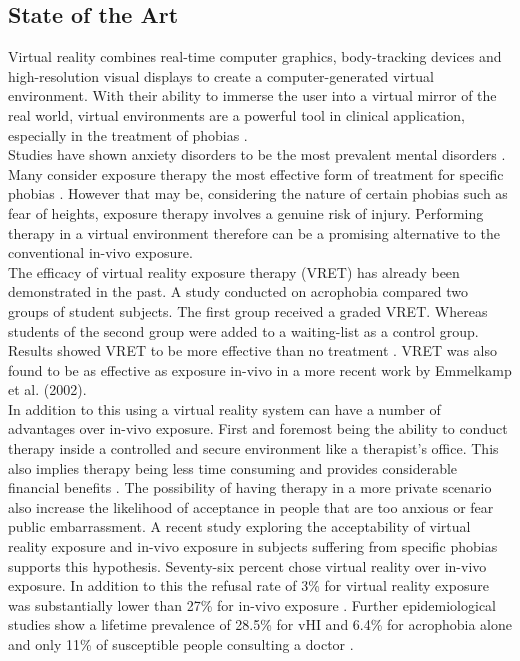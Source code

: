 \subsection{State of the Art}
Virtual reality combines real-time computer graphics, body-tracking devices and high-resolution visual displays to create a computer-generated virtual environment. With their ability to immerse the user into a virtual mirror of the real world, virtual environments are a powerful tool in clinical application, especially in the treatment of phobias \cite{RIVA2003}. \\
Studies have shown anxiety disorders to be the most prevalent mental disorders \cite{KESSLER2005}. Many consider exposure therapy the most effective form of treatment for specific phobias \cite{DERUBEIS1998}. However that may be, considering the nature of certain phobias such as fear of heights, exposure therapy involves a genuine risk of injury. Performing therapy in a virtual environment therefore can be a promising alternative to the conventional in-vivo exposure.\\ 
The efficacy of virtual reality exposure therapy (VRET) has already been demonstrated in the past. A study conducted on acrophobia compared two groups of student subjects. The first group received a graded VRET. Whereas students of the second group were added to a waiting-list as a control group. Results showed VRET to be more effective than no treatment \cite{ROTHBAUM1995}. VRET was also found to be as effective as exposure in-vivo in a more recent work by Emmelkamp et al. (2002).\\
In addition to this using a virtual reality system can have a number of advantages over in-vivo exposure. First and foremost being the ability to conduct therapy inside a controlled and secure environment like a therapist's office. This also implies therapy being less time consuming and provides considerable financial benefits \cite{CAVANAGH2004}. The possibility of having therapy in a more private scenario also increase the likelihood of acceptance in people that are too anxious or fear public embarrassment. 
A recent study exploring the acceptability of virtual reality exposure and in-vivo exposure in subjects suffering from specific phobias supports this hypothesis. Seventy-six percent chose virtual reality over in-vivo exposure. In addition to this the refusal rate of 3\% for virtual reality exposure was substantially lower than 27\% for in-vivo exposure \cite{GARCIA2007}. Further epidemiological studies show a lifetime prevalence of 28.5\% for vHI and 6.4\% for acrophobia alone and only 11\% of susceptible people consulting a doctor \cite{HUPPERT2013} \cite{KAPFHAMMER2015}.\\

